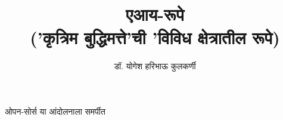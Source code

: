 
\usepackage{fontspec}
\setmainfont[Script=Devanagari]{Nirmala Text}
\newfontfamily{}
\newfontfamily{}
\graphicspath{{images/}}

\date{}

\title{
    {\Huge \textbf{\color{titlecolor} एआय-रूपे}} \\ 
    \vspace{0.5em}
    {\large \color{subtitlecolor} ('कृत्रिम बुद्धिमत्ते'ची 'विविध क्षेत्रातील रूपे)}
}

\author{\textsc{\color{authorcolor}डॉ. योगेश हरिभाऊ कुलकर्णी}}

\renewcommand{\contentsname}{अनुक्रमणिका}



\frontmatter

\maketitle



\begin{dedication}
ओपन-सोर्स या आंदोलनाला समर्पीत
\end{dedication}

\tableofcontents

\mainmatter




